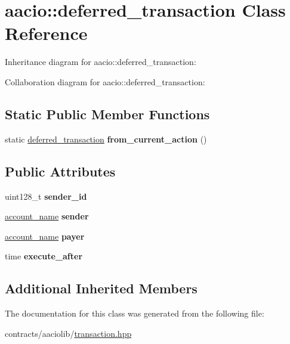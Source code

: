 \hypertarget{classaacio_1_1deferred__transaction}{}\section{aacio\+:\+:deferred\+\_\+transaction Class Reference}
\label{classaacio_1_1deferred__transaction}


Inheritance diagram for aacio\+:\+:deferred\+\_\+transaction\+:


Collaboration diagram for aacio\+:\+:deferred\+\_\+transaction\+:
\subsection*{Static Public Member Functions}
\begin{DoxyCompactItemize}
\item 
\mbox{\label{classaacio_1_1deferred__transaction_a49961d85c8d29684e22858cfb8c3428e}} 
static \mbox{\hyperlink{classaacio_1_1deferred__transaction}{deferred\+\_\+transaction}} {\bfseries from\+\_\+current\+\_\+action} ()
\end{DoxyCompactItemize}
\subsection*{Public Attributes}
\begin{DoxyCompactItemize}
\item 
\mbox{\label{classaacio_1_1deferred__transaction_a983b52a6adf66110392a49b196b3a5bc}} 
uint128\+\_\+t {\bfseries sender\+\_\+id}
\item 
\mbox{\label{classaacio_1_1deferred__transaction_a8b5c328cacba1a3dbd1f1692cbe83487}} 
\mbox{\hyperlink{structaacio_1_1chain_1_1name}{account\+\_\+name}} {\bfseries sender}
\item 
\mbox{\label{classaacio_1_1deferred__transaction_aa34a7a2c566d7d224f9a26a6c6d5c16b}} 
\mbox{\hyperlink{structaacio_1_1chain_1_1name}{account\+\_\+name}} {\bfseries payer}
\item 
\mbox{\label{classaacio_1_1deferred__transaction_a5a22fac4a31068da282b79eefbeb2ebb}} 
time {\bfseries execute\+\_\+after}
\end{DoxyCompactItemize}
\subsection*{Additional Inherited Members}


The documentation for this class was generated from the following file\+:\begin{DoxyCompactItemize}
\item 
contracts/aaciolib/\mbox{\hyperlink{contracts_2aaciolib_2transaction_8hpp}{transaction.\+hpp}}\end{DoxyCompactItemize}
